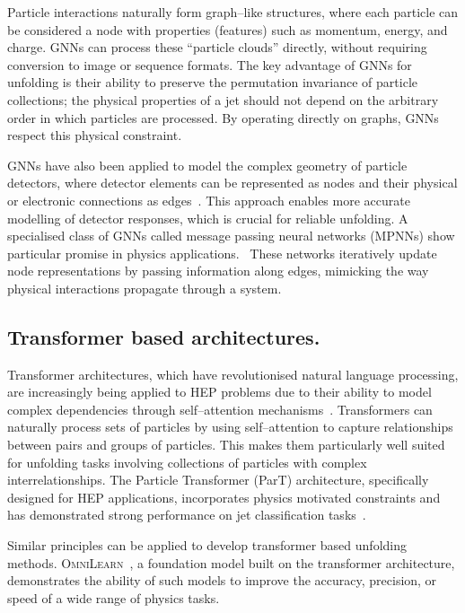     Particle interactions naturally form graph--like structures, where each particle can be considered a node with properties (features) such as momentum, energy, and charge.
    GNNs can process these ``particle clouds'' directly, without requiring conversion to image or sequence formats.
    The key advantage of GNNs for unfolding is their ability to preserve the permutation invariance of particle collections;
    the physical properties of a jet should not depend on the arbitrary order in which particles are processed.
    By operating directly on graphs, GNNs respect this physical constraint.

    GNNs have also been applied to model the complex geometry of particle detectors, where detector elements can be represented as nodes and their physical or electronic connections as edges~\cite{Shlomi2020GraphPhysics, Thais2022GraphChallenges}.
    This approach enables more accurate modelling of detector responses, which is crucial for reliable unfolding.
    A specialised class of GNNs called message passing neural networks (MPNNs) show particular promise in physics applications.~\cite{Xu2024LearningTransformer}
    These networks iteratively update node representations by passing information along edges, mimicking the way physical interactions propagate through a system.
    
\subsection{Transformer based architectures.}

    Transformer architectures, which have revolutionised natural language processing, are increasingly being applied to HEP problems due to their ability to model complex dependencies through self--attention mechanisms~\cite{Spinner2024Lorentz-EquivariantPhysics}.
    Transformers can naturally process sets of particles by using self--attention to capture relationships between pairs and groups of particles.
    This makes them particularly well suited for unfolding tasks involving collections of particles with complex interrelationships.
    The Particle Transformer (ParT) architecture,\cite{Qu2022ParticleTagging} specifically designed for HEP applications, incorporates physics motivated constraints and has demonstrated strong performance on jet classification tasks~\cite{Araz2025GraphLHC}.
    
    Similar principles can be applied to develop transformer based unfolding methods.
    \textsc{OmniLearn}~\cite{Mikuni2025MethodTasks}, a foundation model built on the transformer architecture, demonstrates the ability of such models to improve the accuracy, precision, or speed of a wide range of physics tasks.

